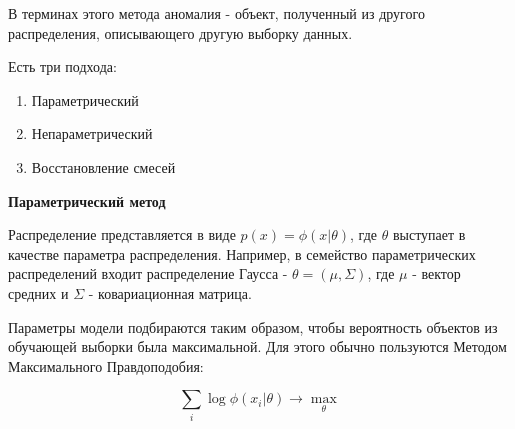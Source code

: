 В терминах этого метода аномалия - объект, полученный из другого распределения, описывающего другую выборку данных.

Есть три подхода:
\begin{enumerate}
  \item Параметрический
  \item Непараметрический
  \item Восстановление смесей
\end{enumerate}

\textbf{Параметрический метод}

Распределение представляется в виде $p(x)=\phi(x\vert\theta)$, где $\theta$ выступает в качестве параметра распределения. Например, в семейство параметрических распределений входит распределение Гаусса - $\theta=(\mu, \Sigma)$, где $\mu$ - вектор средних и $\Sigma$ - ковариационная матрица.

Параметры модели подбираются таким образом, чтобы вероятность объектов из обучающей выборки была максимальной. Для этого обычно пользуются Методом Максимального Правдоподобия:

\[ \sum_{i}\log\phi(x_{i}\vert\theta) \rightarrow \max_{\theta} \]

